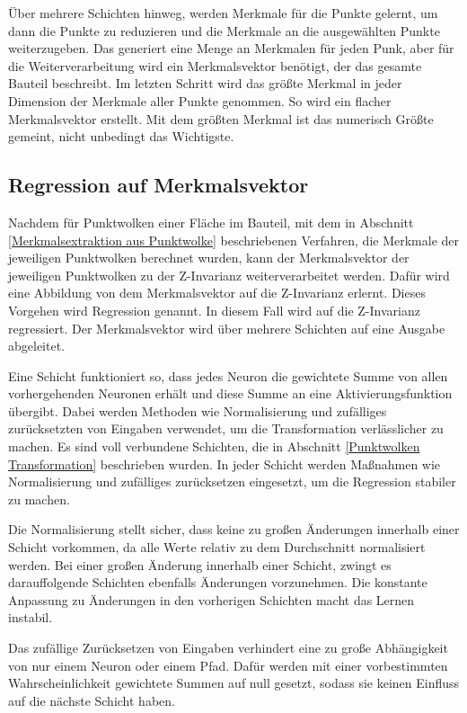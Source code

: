 Über mehrere Schichten hinweg, werden Merkmale für die Punkte gelernt, um dann die Punkte zu reduzieren und die Merkmale an die ausgewählten Punkte weiterzugeben. Das generiert eine Menge an Merkmalen für jeden Punk, 
aber für die Weiterverarbeitung wird ein Merkmalsvektor benötigt, der das gesamte Bauteil beschreibt. Im letzten Schritt wird das größte Merkmal in jeder Dimension der Merkmale aller Punkte genommen. So wird ein flacher Merkmalsvektor erstellt.
Mit dem größten Merkmal ist das numerisch Größte gemeint, nicht unbedingt das Wichtigste. 

\subsection{Regression auf Merkmalsvektor}
\label{Regression auf Merkmalsvektor}

Nachdem für Punktwolken einer Fläche im Bauteil, mit dem in Abschnitt \ref{Merkmalsextraktion aus Punktwolke} beschriebenen Verfahren, die Merkmale der jeweiligen Punktwolken berechnet wurden, kann der Merkmalsvektor der jeweiligen Punktwolken zu der Z-Invarianz weiterverarbeitet werden. 
Dafür wird eine Abbildung von dem Merkmalsvektor auf die Z-Invarianz erlernt. Dieses Vorgehen wird Regression genannt. 
In diesem Fall wird auf die Z-Invarianz regressiert. Der Merkmalsvektor wird über mehrere Schichten auf eine Ausgabe abgeleitet.

\smallskip

Eine Schicht funktioniert so, dass jedes Neuron die gewichtete Summe von allen vorhergehenden Neuronen erhält und diese Summe an eine Aktivierungsfunktion übergibt. Dabei werden Methoden wie Normalisierung und zufälliges zurücksetzten von Eingaben verwendet, um
die Transformation verlässlicher zu machen. Es sind voll verbundene Schichten, die in Abschnitt \ref{Punktwolken Transformation} beschrieben wurden.
In jeder Schicht werden Maßnahmen wie Normalisierung und zufälliges zurücksetzen eingesetzt, um die Regression stabiler zu machen.

Die Normalisierung stellt sicher, dass keine zu großen Änderungen innerhalb einer Schicht vorkommen, da alle Werte relativ zu dem Durchschnitt normalisiert werden. Bei einer großen Änderung innerhalb einer Schicht, zwingt es darauffolgende Schichten ebenfalls Änderungen vorzunehmen. 
Die konstante Anpassung zu Änderungen in den vorherigen Schichten macht das Lernen instabil.

Das zufällige Zurücksetzen von Eingaben verhindert eine zu große Abhängigkeit von nur einem Neuron oder einem Pfad. Dafür werden mit einer vorbestimmten Wahrscheinlichkeit gewichtete Summen auf null gesetzt, sodass sie keinen Einfluss auf die nächste Schicht haben.

